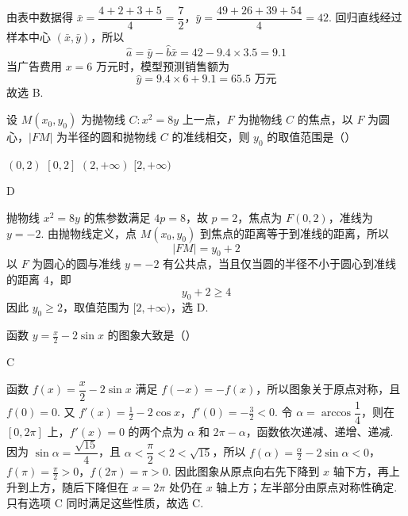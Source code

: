 \begin{solution}
由表中数据得 \(\bar{x}=\dfrac{4+2+3+5}{4}=\dfrac72\)，\(\bar{y}=\dfrac{49+26+39+54}{4}=42\).
回归直线经过样本中心 \((\bar{x},\bar{y})\)，所以
\[
\hat{a}=\bar{y}-\hat{b}\bar{x}=42-9.4\times3.5=9.1
\]
当广告费用 \(x=6\) 万元时，模型预测销售额为
\[
\hat{y}=9.4\times6+9.1=65.5\text{ 万元}
\]
故选 B.
\end{solution}

\begin{problem}
设 \(M(x_0, y_0)\) 为抛物线 \(C: x^2 = 8y\) 上一点，\(F\) 为抛物线 \(C\) 的焦点，以 \(F\) 为圆心，\(|FM|\) 为半径的圆和抛物线 \(C\) 的准线相交，则 \(y_0\) 的取值范围是（\quad）

\choices
    {\((0,2)\)}
    {\([0,2]\)}
    {\((2, + \infty)\)}
    {\([2, + \infty)\)}
\end{problem}

\begin{answer}
D
\end{answer}

\begin{solution}
抛物线 \(x^2=8y\) 的焦参数满足 \(4p=8\)，故 \(p=2\)，焦点为 \(F(0,2)\)，准线为 \(y=-2\). 由抛物线定义，点 \(M(x_0,y_0)\) 到焦点的距离等于到准线的距离，所以
\[
|FM|=y_0+2
\]
以 \(F\) 为圆心的圆与准线 \(y=-2\) 有公共点，当且仅当圆的半径不小于圆心到准线的距离 \(4\)，即
\[
y_0+2\geqslant4
\]
因此 \(y_0\geqslant2\)，取值范围为 \([2,+\infty)\)，选 D.
\end{solution}

\begin{problem}
函数 \( y = \frac{x}{2} - 2\sin x \) 的图象大致是（\quad）

    {}
    {}
    {}
\end{problem}

\begin{answer}
C
\end{answer}

\begin{solution}
函数 \(f(x)=\dfrac{x}{2}-2\sin x\) 满足 \(f(-x)=-f(x)\)，所以图象关于原点对称，且 \(f(0)=0\). 又
\(f'(x)=\frac12-2\cos x\)，\(f'(0)=-\frac32<0\).
令 \(\alpha=\arccos\dfrac14\)，则在 \([0,2\pi]\) 上，\(f'(x)=0\) 的两个点为 \(\alpha\) 和 \(2\pi-\alpha\)，函数依次递减、递增、递减. 因为 \(\sin\alpha=\dfrac{\sqrt{15}}{4}\)，且 \(\alpha<\dfrac{\pi}{2}<2<\sqrt{15}\)，所以
\(f(\alpha)=\frac{\alpha}{2}-2\sin\alpha<0\)，\(f(\pi)=\frac\pi2>0\)，\(f(2\pi)=\pi>0\).
因此图象从原点向右先下降到 \(x\) 轴下方，再上升到上方，随后下降但在 \(x=2\pi\) 处仍在 \(x\) 轴上方；左半部分由原点对称性确定. 只有选项 C 同时满足这些性质，故选 C.
\end{solution}

